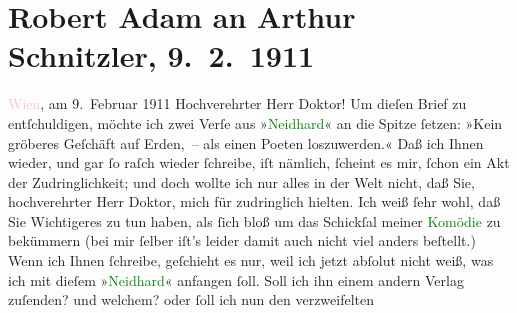 

               \section[Robert Adam an Arthur Schnitzler, 9. 2. 1911]{ Robert Adam an Arthur Schnitzler, 9. 2. 1911}\nopagebreak{}\rehead{ }\normalsize\beginnumbering{} \toendnotes[C]{\smallbreak\pagebreak[2]} 
\toendnotes[C]{\smallbreak}\pstart
           \raggedleft{}{\pb}\textcolor{pink}{Wien}{}\ledrightnote{\textcolor{pink}{Wien}}, am 9. Februar 1911\pend
           \pstart{}Hochverehrter Herr Doktor!\pend\pstart
           Um dieſen Brief zu entſchuldigen, möchte ich zwei Verſe aus »\textcolor{green}{Neidhard}{}\ledrightnote{\textcolor{green}{Neidhard}}« an die Spitze ſetzen: »Kein gröberes Geſchäft auf
               Erden, – als einen Poeten loszuwerden.« Daß ich Ihnen wieder, und gar ſo raſch wieder
               ſchreibe, iſt nämlich, ſcheint es mir, ſchon ein Akt der Zudringlichkeit; und doch
               wollte ich nur alles in der Welt nicht, daß Sie, hochverehrter Herr Doktor, mich für
               zudringlich hielten. Ich weiß ſehr wohl, daß Sie Wichtigeres zu tun haben, als ſich
               bloß um das Schickſal meiner \textcolor{green}{Komödie}{} zu beküm{\pb}mern (bei mir ſelber iſt’s
               leider damit auch nicht viel anders beſtellt.)\pend
           \pstart
           Wenn ich Ihnen ſchreibe, geſchieht es nur, weil ich jetzt abſolut nicht weiß, was ich
               mit dieſem »\textcolor{green}{Neidhard}{}\ledrightnote{\textcolor{green}{Neidhard}}« anfangen ſoll. Soll ich ihn
               einem andern Verlag zuſenden? und welchem? oder ſoll ich nun den verzweifelten
